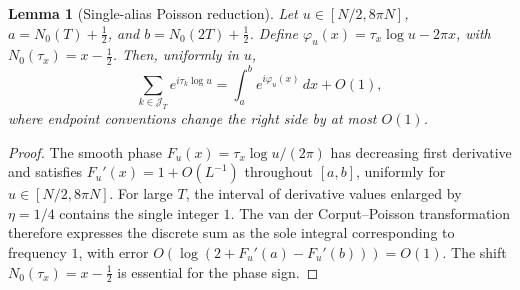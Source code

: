 \documentclass[11pt,reqno]{amsart}
\numberwithin{equation}{section}
\newtheorem{lemma}[theorem]{Lemma}
\begin{document}
\begin{lemma}[Single-alias Poisson reduction]
\label{lem:C1Poisson}
Let $u\in[N/2,8\pi N]$, $a=N_0(T)+\tfrac12$, and
$b=N_0(2T)+\tfrac12$. Define
$\varphi_u(x)=\tau_x\log u-2\pi x$, with
$N_0(\tau_x)=x-\tfrac12$. Then, uniformly in $u$,
\begin{equation}\label{eq:C1Poisson}
\sum_{k\in\mathcal J_T}e^{i\tau_k\log u}
=\int_a^b e^{i\varphi_u(x)}\,dx+O(1),
\end{equation}
where endpoint conventions change the right side by at most $O(1)$.
\end{lemma}
\begin{proof}
The smooth phase $F_u(x)=\tau_x\log u/(2\pi)$ has decreasing
first derivative and satisfies
$F_u'(x)=1+O(L^{-1})$ throughout $[a,b]$, uniformly for
$u\in[N/2,8\pi N]$. For large $T$, the interval of derivative
values enlarged by $\eta=1/4$ contains the single integer $1$.
The van der Corput--Poisson transformation
\cite[Lemma~4.7]{Titchmarsh1986} therefore expresses the discrete
sum as the sole integral corresponding to frequency $1$, with
error $O(\log(2+F_u'(a)-F_u'(b)))=O(1)$.
The shift $N_0(\tau_x)=x-\tfrac12$ is essential for the phase sign.
\end{proof}
\end{document}
